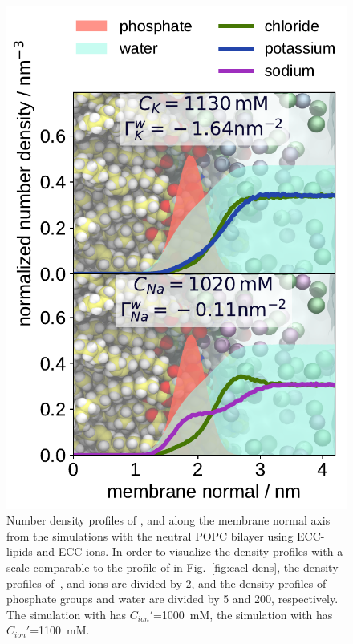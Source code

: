 \begin{figure}[tbp!] 
  \centering 
  \includegraphics[width=\figwidth]{../img/ecc_popc/density_profiles_ca_cl_wat_phos_models-compar_5-7_NaCl-KCl.pdf}
  \caption{\label{fig:nacl-dens} 
    Number density profiles of ,  and  along the membrane normal axis 
    from the simulations with the neutral POPC bilayer using ECC-lipids and ECC-ions.  
    In order to visualize the density profiles with a scale comparable to the profile of  in Fig.~\ref{fig:cacl-dens},  
    the density profiles of~,  and  ions are divided by 2, and 
    the density profiles of phosphate groups and water are divided by 5 and 200, respectively.  
    The simulation with  has $C_{ion}'$=1000~mM, 
    the simulation with   has $C_{ion}'$=1100~mM. 
    } 
\end{figure} 



